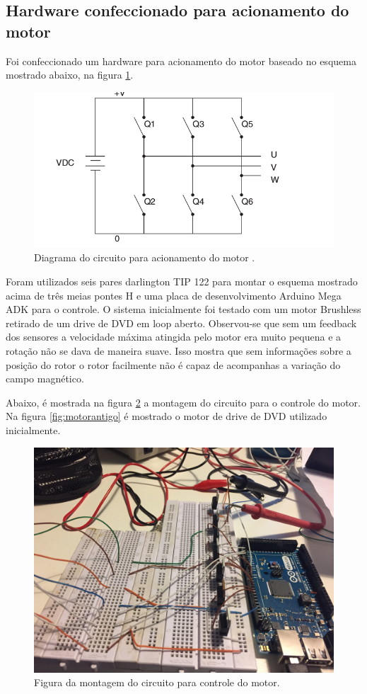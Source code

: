 \documentclass[a4paper,11pt]{article}
\begin{document}
		\subsection{Hardware confeccionado para acionamento do motor}
		
		Foi confeccionado um hardware para acionamento do motor baseado no esquema mostrado abaixo, na figura \ref{fig:diagrama}.
		
		\begin{figure}[ht]
			\centering
			\includegraphics[width=0.7\linewidth]{images/circuitdiagram}
			\caption{Diagrama do circuito para acionamento do motor \cite{atmeldiagrama}.}
			\label{fig:diagrama}
		\end{figure}
	
		Foram utilizados seis pares darlington TIP 122 para montar o esquema mostrado acima de três meias pontes H e uma placa de desenvolvimento Arduino Mega ADK para o controle. O sistema inicialmente foi testado com um motor Brushless retirado de um drive de DVD em loop aberto. Observou-se que sem um feedback dos sensores a velocidade máxima atingida pelo motor era muito pequena e a rotação não se dava de maneira suave. Isso mostra que sem informações sobre a posição do rotor o rotor facilmente não é capaz de acompanhas a variação do campo magnético.
		
		Abaixo, é mostrada na figura \ref{fig:montagemcircuito} a montagem do circuito para o controle do motor. Na figura \ref{fig:motorantigo} é mostrado o motor de drive de DVD utilizado inicialmente.
		
		\begin{figure}[ht]
			\centering
			\includegraphics[width=0.5\linewidth]{images/montagemcircuito}
			\caption{Figura da montagem do circuito para controle do motor.}
			\label{fig:montagemcircuito}
		\end{figure}
		
\end{document}
